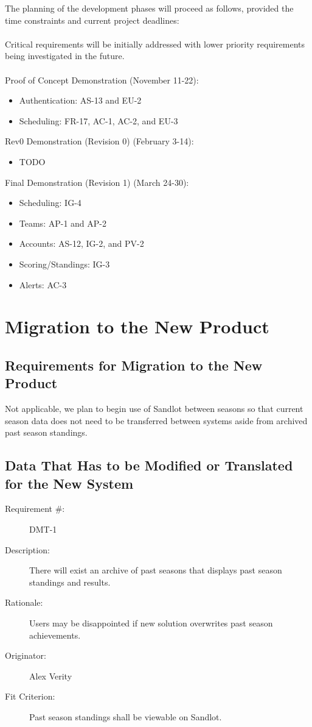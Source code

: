 \documentclass[12pt]{article}
\newenvironment{myreq}[1]{%
\setlist[description]{font=\normalfont\color{darkgray}}%
\begin{tcolorbox}[colframe=black,colback=white, sharp corners, boxrule=1pt]%
\bfseries\color{blue}%
\begin{description}#1}%
{\end{description}\end{tcolorbox}}
\newcommand{\twoinline}[2]{\begin{multicols}{2}#1 #2\end{multicols}}
\newcommand{\reqno}{\item[Requirement \#:]}
\newcommand{\reqdesc}{\item[Description:]}
\newcommand{\reqrat}{\item[Rationale:]}
\newcommand{\reqorig}{\item[Originator:]}
\newcommand{\reqfit}{\item[Fit Criterion:]}
\newcommand{\reqsatis}{\item[Customer Satisfaction:]}
\newcommand{\reqdissat}{\item[Customer Dissatisfaction:]}
\begin{document}
The planning of the development phases will proceed as follows, provided the time
constraints and current project deadlines: \\\\
Critical requirements will be initially addressed with lower priority requirements
being investigated in the future. \\\\

Proof of Concept Demonstration (November 11-22):
\begin{itemize}
  \item Authentication: AS-13 and EU-2
  \item Scheduling: FR-17, AC-1, AC-2, and EU-3
\end{itemize}

Rev0 Demonstration (Revision 0) (February 3-14):
\begin{itemize}
  \item TODO
\end{itemize}

Final Demonstration (Revision 1) (March 24-30):
\begin{itemize}
  \item Scheduling: IG-4
  \item Teams: AP-1 and AP-2
  \item Accounts: AS-12, IG-2, and PV-2
  \item Scoring/Standings: IG-3
  \item Alerts: AC-3
\end{itemize}

\section{Migration to the New Product}
\subsection{Requirements for Migration to the New Product}
Not applicable, we plan to begin use of Sandlot between seasons so that
current season data does not need to be transferred between systems aside from
archived past season standings.

\subsection{Data That Has to be Modified or Translated for the New System}

\begin{myreq}
  \reqno DMT-1
  \reqdesc There will exist an archive of past seasons that displays past
  season standings and results.
  \reqrat Users may be disappointed if new solution overwrites past season
  achievements.
  \reqorig Alex Verity
  \reqfit Past season standings shall be viewable on Sandlot.
  \twoinline
    {\reqsatis 1}
    {\reqdissat 2}
\end{myreq}
\end{document}

